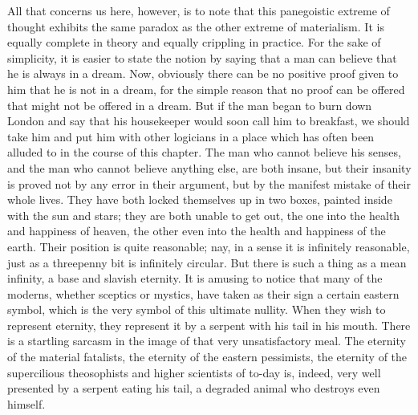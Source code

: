 All that concerns us here, however, is to note that this panegoistic extreme of thought exhibits the same paradox as the other extreme of materialism. It is equally complete in theory and equally crippling in practice. For the sake of simplicity, it is easier to state the notion by saying that a man can believe that he is always in a dream. Now, obviously there can be no positive proof given to him that he is not in a dream, for the simple reason that no proof can be offered that might not be offered in a dream. But if the man began to burn down London and say that his housekeeper would soon call him to breakfast, we should take him and put him with other logicians in a place which has often been alluded to in the course of this chapter. The man who cannot believe his senses, and the man who cannot believe anything else, are both insane, but their insanity is proved not by any error in their argument, but by the manifest mistake of their whole lives. They have both locked themselves up in two boxes, painted inside with the sun and stars; they are both unable to get out, the one into the health and happiness of heaven, the other even into the health and happiness of the earth. Their position is quite reasonable; nay, in a sense it is infinitely reasonable, just as a threepenny bit is infinitely circular. But there is such a thing as a mean infinity, a base and slavish eternity. It is amusing to notice that many of the moderns, whether sceptics or mystics, have taken as their sign a certain eastern symbol, which is the very symbol of this ultimate nullity. When they wish to represent eternity, they represent it by a serpent with his tail in his mouth. There is a startling sarcasm in the image of that very unsatisfactory meal. The eternity of the material fatalists, the eternity of the eastern pessimists, the eternity of the supercilious theosophists and higher scientists of to-day is, indeed, very well presented by a serpent eating his tail, a degraded animal who destroys even himself.

